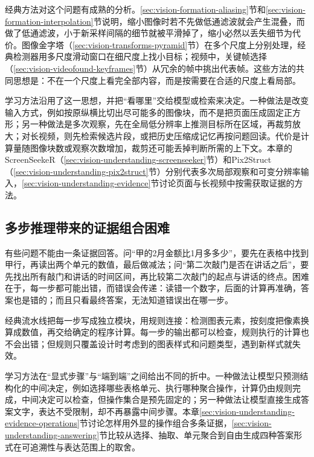 经典方法对这个问题有成熟的分析。\ref{sec:vision-formation-aliasing}节和\ref{sec:vision-formation-interpolation}节说明，缩小图像时若不先做低通滤波就会产生混叠，而做了低通滤波，小于新采样间隔的细节就被平滑掉了，缩小必然以丢失细节为代价。图像金字塔（\ref{sec:vision-transforms-pyramid}节）在多个尺度上分别处理，经典检测器用多尺度滑动窗口在细尺度上找小目标；视频中，关键帧选择（\ref{sec:vision-videofound-keyframes}节）从冗余的帧中挑出代表帧。这些方法的共同思想是：不在一个尺度上看完全部内容，而是按需要在合适的尺度上看局部。

学习方法沿用了这一思想，并把“看哪里”交给模型或检索来决定。一种做法是改变输入方式，例如按原纵横比切出尽可能多的图像块，而不是把页面压成固定正方形；另一种做法是多次观察，先在全局低分辨率上推测目标所在区域，再裁剪放大；对长视频，则先检索候选片段，或把历史压缩成记忆再按问题回读。代价是计算量随图像块数或观察次数增加，裁剪还可能丢掉判断所需的上下文。本章的ScreenSeekeR（\ref{sec:vision-understanding-screenseeker}节）和Pix2Struct（\ref{sec:vision-understanding-pix2struct}节）分别代表多次局部观察和可变分辨率输入，\ref{sec:vision-understanding-evidence}节讨论页面与长视频中按需获取证据的方法。

\subsection{多步推理带来的证据组合困难}
\label{sec:vision-understanding-challenge-composition}

有些问题不能由一条证据回答。问“甲的2月金额比1月多多少”，要先在表格中找到甲行，再读出两个单元的数值，最后做减法；问“第二次敲门是否在讲话之后”，要先找出所有敲门和讲话的时间区间，再比较第二次敲门的起点与讲话的终点。困难在于，每一步都可能出错，而错误会传递：读错一个数字，后面的计算再准确，答案也是错的；而且只看最终答案，无法知道错误出在哪一步。

经典流水线把每一步写成独立模块，用规则连接：检测图表元素，按刻度把像素换算成数值，再交给确定的程序计算。每一步的输出都可以检查，规则执行的计算也不会出错；但规则只覆盖设计时考虑到的图表样式和问题类型，遇到新样式就失效。

学习方法在“显式步骤”与“端到端”之间给出不同的折中。一种做法让模型只预测结构化的中间决定，例如选择哪些表格单元、执行哪种聚合操作，计算仍由规则完成，中间决定可以检查，但操作集合是预先固定的；另一种做法让模型直接生成答案文字，表达不受限制，却不再暴露中间步骤。本章\ref{sec:vision-understanding-evidence-operations}节讨论怎样用外显的操作组合多条证据，\ref{sec:vision-understanding-answering}节比较从选择、抽取、单元聚合到自由生成四种答案形式在可追溯性与表达范围上的取舍。

